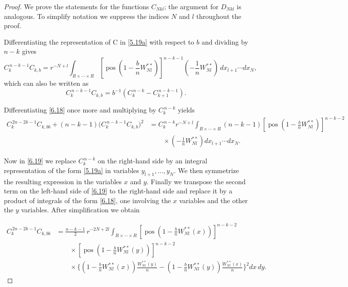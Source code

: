 \documentclass[11pt]{article}
\begin{document}
\begin{proof}
We prove the statements for the functions $C_{Nkl}$; the argument for $D_{Nkl}$ is analogous.
To simplify notation we suppress the indices $N$ and $l$ throughout the proof.

Differentiating the representation of C in \eqref{5.19a} with respect to $b$ and dividing by $n-k$
gives
\begin{equation}
C_k^{\,n-k-1} C_{k,b}
=
r^{-N+l}
\int_{R\times\cdots\times R}
\left[\operatorname{pos}\!\left(1-\frac{b}{n}W_{Nl}^{**}\right)\right]^{n-k-1}
\left(-\frac{1}{n}W_{Nl}^{**}\right)
\,dx_{l+1}\cdots dx_N ,
\tag{6.18}\label{6.18}
\end{equation}
which can also be written as
\[
C_k^{\,n-k-1} C_{k,b}
=
b^{-1}\left(C_k^{\,n-k}-C_{k+1}^{\,n-k-1}\right).
\]

Differentiating \eqref{6.18} once more and multiplying by $C_k^{\,n-k}$ yields
\begin{align}
C_k^{\,2n-2k-1} C_{k,bb}
+
(n-k-1)\bigl(C_k^{\,n-k-1}C_{k,b}\bigr)^2
&=
C_k^{\,n-k} r^{-N+l}
\int_{R\times\cdots\times R}
(n-k-1)
\left[\operatorname{pos}\!\left(1-\frac{b}{n}W_{Nl}^{**}\right)\right]^{n-k-2}
\nonumber\\
&\qquad\times
\left(-\frac{1}{n}W_{Nl}^{**}\right)
dx_{l+1}\cdots dx_N .
\tag{6.19}\label{6.19}
\end{align}

Now in \eqref{6.19} we replace $C_k^{\,n-k}$ on the right-hand side by an
integral representation of the form \eqref{5.19a} in variables
$y_{l+1},\dots,y_N$. 
We then symmetrize the resulting expression in the variables $x$ and $y$.
Finally we transpose the second term on the left-hand side of \eqref{6.19}
to the right-hand side and replace it by a product of integrals of the form
\eqref{6.18}, one involving the $x$ variables and the other the $y$ variables.
After simplification we obtain

\begin{align}
C_k^{\,2n-2k-1} C_{k,bb}
&=
\frac{n-k-1}{2}\, r^{-2N+2l}
\int_{R\times\cdots\times R}
\left[\operatorname{pos}\!\left(1-\frac{b}{n}W_{Nl}^{**}(x)\right)\right]^{n-k-2}
\nonumber\\
&\qquad\times
\left[\operatorname{pos}\!\left(1-\frac{b}{n}W_{Nl}^{**}(y)\right)\right]^{n-k-2}
\nonumber\\
&\qquad\times
\Bigg\{
\left(1-\frac{b}{n}W_{Nl}^{**}(x)\right)\frac{W_{Nl}^{**}(y)}{n}
-
\left(1-\frac{b}{n}W_{Nl}^{**}(y)\right)\frac{W_{Nl}^{**}(x)}{n}
\Bigg\}^2
dx\,dy .
\tag{6.20}\label{6.20}
\end{align}


\end{proof}
\end{document}

